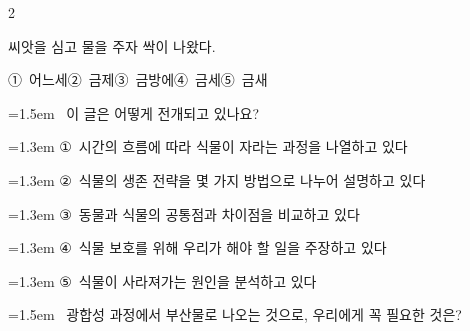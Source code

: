 \documentclass[11pt, a4paper]{article}
\begin{document}
\begin{multicols}{2}
\begin{minipage}{\columnwidth}
\vspace{1mm}
\begin{boxibox}
씨앗을 심고 물을 주자 \underline{\hspace{3cm}} 싹이 나왔다. \\
\end{boxibox}
\vspace{1mm}

\vspace{0.5mm}
\noindent
\mbox{①~어느세}\hspace{1em}\mbox{②~금제}\hspace{1em}\mbox{③~금방에}\hspace{1em}\mbox{④~금세}\hspace{1em}\mbox{⑤~금새}

\vspace{4mm}
\end{minipage}
\par

\noindent\begin{minipage}{\columnwidth}
\vspace{2mm}
{\hangindent=1.5em  ~이 글은 어떻게 전개되고 있나요?\par}

\vspace{0.5mm}
{\hangindent=1.3em  \noindent\hspace{0.3em}①~시간의 흐름에 따라 식물이 자라는 과정을 나열하고 있다\par}
{\hangindent=1.3em  \noindent\hspace{0.3em}②~식물의 생존 전략을 몇 가지 방법으로 나누어 설명하고 있다\par}
{\hangindent=1.3em  \noindent\hspace{0.3em}③~동물과 식물의 공통점과 차이점을 비교하고 있다\par}
{\hangindent=1.3em  \noindent\hspace{0.3em}④~식물 보호를 위해 우리가 해야 할 일을 주장하고 있다\par}
{\hangindent=1.3em  \noindent\hspace{0.3em}⑤~식물이 사라져가는 원인을 분석하고 있다\par}
\vspace{4mm}
\end{minipage}
\par

\noindent\begin{minipage}{\columnwidth}
\vspace{2mm}
{\hangindent=1.5em  ~광합성 과정에서 부산물로 나오는 것으로, 우리에게 꼭 필요한 것은?\par}


\end{minipage}
\end{multicols}
\end{document}
